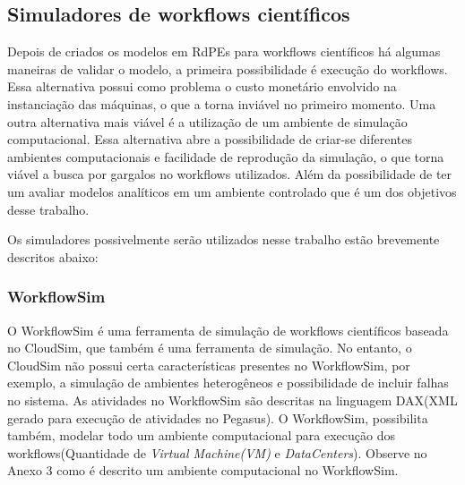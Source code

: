 

	\subsection{Simuladores de workflows científicos}	
			
	Depois de criados os modelos em RdPEs para workflows científicos há algumas maneiras de validar o modelo, a primeira possibilidade é execução do workflows. Essa alternativa possui como problema o custo monetário envolvido na instanciação das máquinas, o que a torna inviável no primeiro momento. Uma outra alternativa mais viável é a  utilização de um ambiente de simulação computacional. Essa alternativa abre a possibilidade de criar-se diferentes ambientes computacionais e facilidade de reprodução da simulação, o que torna viável a busca por gargalos no workflows utilizados. Além da possibilidade de ter um avaliar modelos analíticos em um ambiente controlado que é um dos objetivos desse trabalho.
	
	Os simuladores possivelmente serão utilizados nesse trabalho estão brevemente descritos abaixo:
			\subsubsection{WorkflowSim}
	O WorkflowSim\cite{chen:workflowsim} é uma ferramenta de simulação de workflows científicos baseada no CloudSim\cite{google:cloudsim}, que também é uma ferramenta de simulação. No entanto, o CloudSim não possui certa características presentes no WorkflowSim, por exemplo, a simulação de ambientes heterogêneos e possibilidade de incluir falhas no sistema. As atividades no WorkflowSim  são descritas na linguagem DAX(XML gerado para execução de atividades no Pegasus). O WorkflowSim, possibilita também, modelar todo um ambiente computacional para execução dos workflows(Quantidade de \textit{Virtual Machine(VM)} e \textit{DataCenters}). Observe no Anexo 3 como é descrito um ambiente computacional no WorkflowSim. 
							
				

